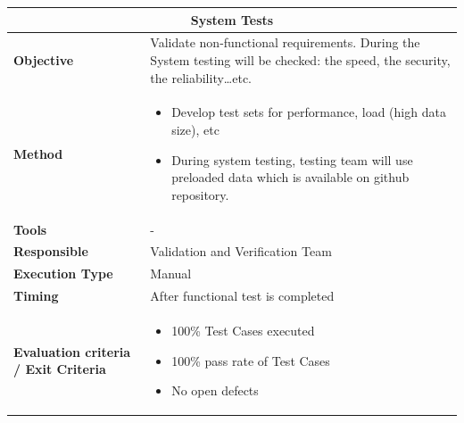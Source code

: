 \begin{center}
\begin{longtable}[H]{|p{4cm}|p{9cm}|}\hline
\multicolumn{2}{|c|}{\textbf{System Tests}}\\\hline
\textbf{Objective} &  Validate non-functional requirements. During the System testing will be checked: the speed, the security, the reliability…etc.\\\hline
\textbf{Method} & \begin{itemize}
\item Develop test sets for performance, load (high data size), etc
\item During system testing, testing team will use preloaded data which is available on github repository.
\end{itemize}  \\\hline
\textbf{Tools} & -\\\hline
\textbf{Responsible} & Validation and Verification Team\\\hline
\textbf{Execution Type} & Manual\\\hline
\textbf{Timing} &  After functional test is completed\\\hline
\textbf{Evaluation criteria / Exit Criteria} & \begin{itemize}
\item 100\% Test Cases executed
\item 100\% pass rate of Test Cases
\item No open defects
\end{itemize} \\\hline
\end{longtable}
\end{center}

